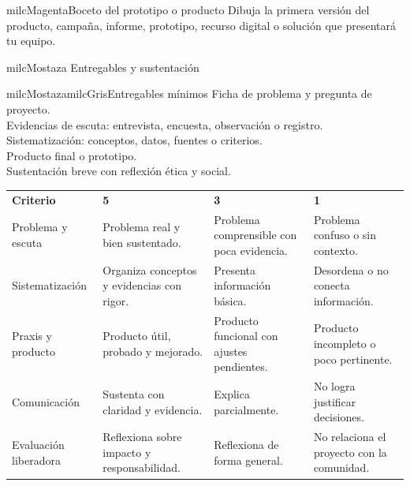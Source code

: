 \documentclass[11pt,letterpaper]{article}
\newcommand{\checkbox}{\textcolor{milcTurquesa}{\fbox{\phantom{x}}}\hspace{5pt}}
\begin{document}
\begin{drawbox}{milcMagenta}{Boceto del prototipo o producto}
Dibuja la primera versión del producto, campaña, informe, prototipo, recurso digital o solución que presentará tu equipo.
\vspace{6cm}
\end{drawbox}

\newpage
\begin{titlebox}{milcMostaza}
Entregables y sustentación
\end{titlebox}
\begin{softbox}{milcMostaza}{milcGris}{Entregables mínimos}
\checkbox Ficha de problema y pregunta de proyecto.\\
\checkbox Evidencias de escuta: entrevista, encuesta, observación o registro.\\
\checkbox Sistematización: conceptos, datos, fuentes o criterios.\\
\checkbox Producto final o prototipo.\\
\checkbox Sustentación breve con reflexión ética y social.
\end{softbox}

\begin{tabularx}{\textwidth}{p{4.1cm}XXX}
\rowcolor{milcVino}\color{white}\bfseries Criterio & \color{white}\bfseries 5 & \color{white}\bfseries 3 & \color{white}\bfseries 1\\
Problema y escuta & Problema real y bien sustentado. & Problema comprensible con poca evidencia. & Problema confuso o sin contexto.\\
Sistematización & Organiza conceptos y evidencias con rigor. & Presenta información básica. & Desordena o no conecta información.\\
Praxis y producto & Producto útil, probado y mejorado. & Producto funcional con ajustes pendientes. & Producto incompleto o poco pertinente.\\
Comunicación & Sustenta con claridad y evidencia. & Explica parcialmente. & No logra justificar decisiones.\\
Evaluación liberadora & Reflexiona sobre impacto y responsabilidad. & Reflexiona de forma general. & No relaciona el proyecto con la comunidad.\\
\end{tabularx}
\end{document}
